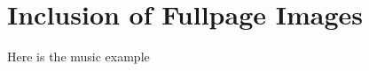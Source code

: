 \documentclass{scrartcl}
\begin{document}
\section{Inclusion of Fullpage Images}

\Blindtext[2]

\afterpage{}

\bigskip

Here is the music example

\bigskip

\Blindtext[6]
\end{document}
